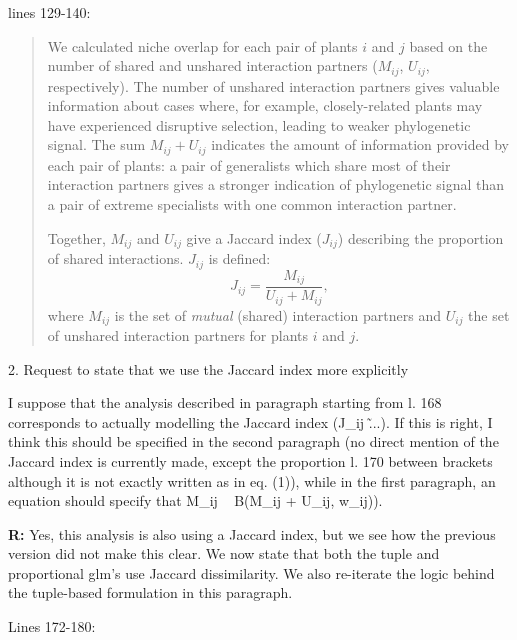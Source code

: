 \documentclass[12pt]{letter}
\newenvironment{refquote}{\bigskip \begin{it}}{\end{it}\smallskip}
\begin{document}
		lines 129-140:


		\begin{quotation}

			We calculated niche overlap for each pair of plants $i$ and $j$ based on the number of shared and unshared interaction partners ($M_{ij}$, $U_{ij}$, respectively). 
			The number of unshared interaction 
			partners gives valuable information about cases where, for example, 
			closely-related plants may have experienced disruptive selection, leading to weaker phylogenetic signal. 
			The sum $M_{ij} + U_{ij}$ indicates the amount of information  provided by each pair of plants: a pair of generalists which share most of their interaction partners gives a stronger indication of phylogenetic signal than a pair of extreme specialists with one common interaction partner.


			Together, $M_{ij}$ and $U_{ij}$ give a Jaccard index ($J_{ij}$) describing 
			the proportion of shared interactions. $J_{ij}$ is defined: 
			\begin{equation}
			J_{ij} = \frac{M_{ij}}{U_{ij}+M_{ij}} ,
			\end{equation}
			where $M_{ij}$ is the set of \emph{mutual} (shared) interaction partners and $U_{ij}$ the set of unshared interaction partners for plants $i$ and $j$.

		\end{quotation} 


	2. Request to state that we use the Jaccard index more explicitly 


		\begin{refquote}
			I suppose that the analysis described in paragraph starting from l. 168 corresponds to actually modelling the Jaccard index (J\_ij \~ ...). If this is right, I think this should be specified in the second paragraph (no direct mention of the Jaccard index is currently made, except the proportion l. 170 between brackets although it is not exactly written as in eq. (1)), while in the first paragraph, an equation should specify that M\_ij ~ B(M\_ij + U\_ij, w\_ij)).
		\end{refquote}


		\textbf{R:} Yes, this analysis is also using a Jaccard index, but we see how the previous version did not make this clear. We now state that both the tuple and proportional glm's use Jaccard dissimilarity. We also re-iterate the logic behind the tuple-based formulation in this paragraph.


			Lines 172-180:
\end{document}
